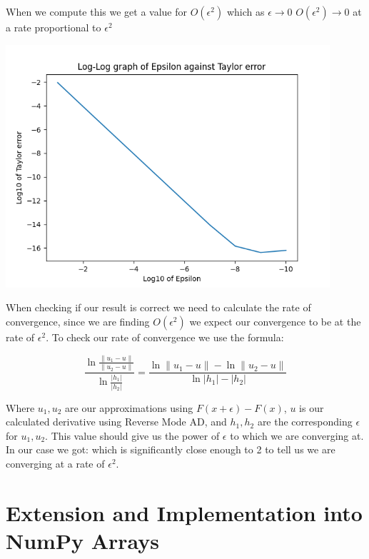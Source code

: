 \documentclass{article}
\begin{document}
When we compute this we get a value for $O(\epsilon^2)$ which as $\epsilon \to 0$ $O(\epsilon^2) \to 0$ at a rate proportional to $\epsilon^2$

\begin{center}
    \includegraphics[width=12cm]{images/Taylor_error_1.png}
\end{center}

When checking if our result is correct we need to calculate the rate of convergence, since we are finding $O(\epsilon^2)$ we expect our convergence to be at the rate of $\epsilon^2$. To check our rate of convergence we use the formula:

\begin{equation}
    \frac{\ln{\frac{\|u_1 - u\|}{\|u_2 - u\|}}}{\ln{\frac{|h_1|}{|h_2|}}} = \frac{\ln\|u_1 - u\| - \ln\|u_2 - u\|}{\ln|h_1| - |h_2|}
\end{equation}

Where $u_1, u_2$ are our approximations using $F(x + \epsilon) - F(x)$, $u$ is our calculated derivative using Reverse Mode AD, and $h_1, h_2$ are the corresponding $\epsilon$ for $u_1, u_2$. This value should give us the power of $\epsilon$ to which we are converging at. In our case we got:  which is significantly close enough to 2 to tell us we are converging at a rate of $\epsilon^2$.





\section{Extension and Implementation into NumPy Arrays}
\end{document}
